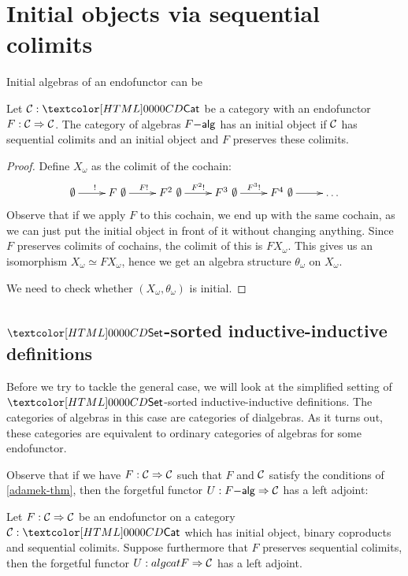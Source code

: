 \section{Initial objects via sequential colimits}

Initial algebras of an endofunctor can be 

\begin{theorem}[Ad\'amek]
  \label{adamek-thm}
  Let $\Cc : \Cat$ be a category with an endofunctor
  $F : \mathcal{C} \Rightarrow \mathcal{C}$. The category of algebras $F\mathsf{-alg}$ has an
  initial object if $\mathcal{C}$ has sequential colimits and an initial
  object and $F$ preserves these colimits.
\end{theorem}

\begin{proof}
  Define $X_\omega$ as the colimit of the cochain:
  $$
  \xymatrix{
    \initobj \ar[r]^{\inithom} 
    &F\ \initobj \ar[r]^{F \inithom} 
    &F^2\ \initobj \ar[r]^{F^2 \inithom} 
    &F^3\ \initobj \ar[r]^{F^3 \inithom} 
    &F^4\ \initobj \ar[r] 
    &\hdots
  }
  $$
  Observe that if we apply $F$ to this cochain, we end up with the
  same cochain, as we can just put the initial object in front of it
  without changing anything. Since $F$ preserves colimits of cochains,
  the colimit of this is $F X_\omega$. This gives us an isomorphism
  $X_\omega \simeq F X_\omega$, hence we get an algebra structure
  $\theta_\omega$ on $X_\omega$.

  We need to check whether $(X_\omega,\theta_\omega)$ is initial.
\end{proof}

\subsection{$\Set$-sorted inductive-inductive definitions}

Before we try to tackle the general case, we will look at the
simplified setting of $\Set$-sorted inductive-inductive
definitions. The categories of algebras in this case are categories of
dialgebras. As it turns out, these categories are equivalent to
ordinary categories of algebras for some endofunctor.

Observe that if we have $F : \mathcal{C} \Rightarrow \mathcal{C}$ such that $F$ and $\mathcal{C}$
satisfy the conditions of \cref{adamek-thm}, then the forgetful
functor $U : F\mathsf{-alg} \Rightarrow \mathcal{C}$ has a left adjoint:

\begin{proposition}
  Let $F : \mathcal{C} \Rightarrow \mathcal{C}$ be an endofunctor on a category
  $\Cc : \Cat$ which has initial object, binary coproducts and
  sequential colimits. Suppose furthermore that $F$ preserves
  sequential colimits, then the forgetful functor
  $U : algcat{F} \Rightarrow \mathcal{C}$ has a left adjoint.
\end{proposition}

